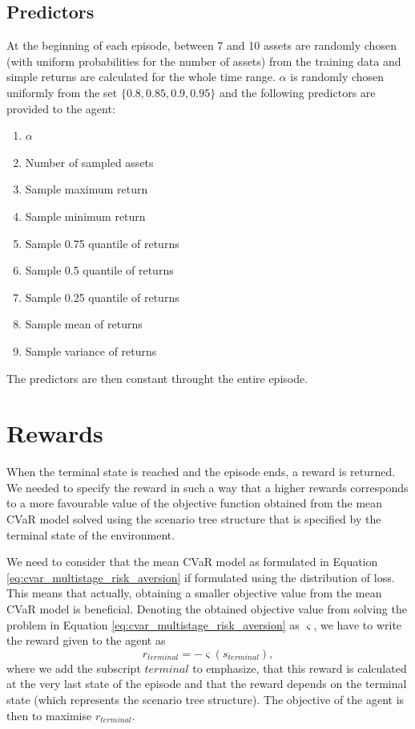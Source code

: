 \subsection{Predictors}
\label{subsection:predictors}
At the beginning of each episode, between 7 and 10 assets are randomly chosen (with uniform probabilities for the number of assets) from the training data and simple returns are calculated for the whole time range. $\alpha$ is randomly chosen uniformly from the set $\{0.8, 0.85, 0.9, 0.95\}$ and the following predictors are provided to the agent:
\begin{enumerate}
\item $\alpha$
\item Number of sampled assets
\item Sample maximum return
\item Sample minimum return
\item Sample 0.75 quantile of returns
\item Sample 0.5 quantile of returns
\item Sample 0.25 quantile of returns
\item Sample mean of returns
\item Sample variance of returns
\end{enumerate}
The predictors are then constant throught the entire episode.

\section{Rewards}
When the terminal state is reached and the episode ends, a reward is returned. We needed to specify the reward in such a way that a higher rewards corresponds to a more favourable value of the objective function obtained from the mean CVaR model solved using the scenario tree structure that is specified by the terminal state of the environment.

We need to consider that the mean CVaR model as formulated in Equation \ref{eq:cvar_multistage_risk_aversion} if formulated using the distribution of loss. This means that actually, obtaining a smaller objective value from the mean CVaR model is beneficial. Denoting the obtained objective value from solving the problem in Equation \ref{eq:cvar_multistage_risk_aversion} as $\varsigma$, we have to write the reward given to the agent as
\begin{equation*}
r_{terminal} = -\varsigma(s_{terminal}),
\end{equation*}
where we add the subscript $terminal$ to emphasize, that this reward is calculated at the very last state of the episode and that the reward depends on the terminal state (which represents the scenario tree structure). The objective of the agent is then to maximise $r_{terminal}$.

